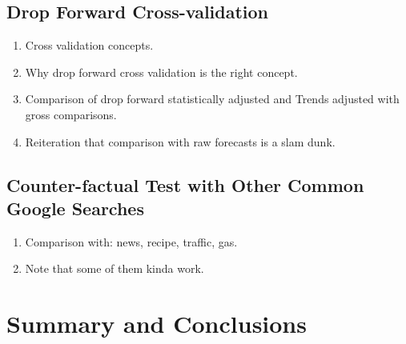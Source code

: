 \documentclass{article}
\begin{document}
  



  \subsection{Drop Forward Cross-validation}


  
  
    \begin{enumerate}
      \item Cross validation concepts.
      \item Why drop forward cross validation is the right concept.
      \item Comparison of drop forward statistically adjusted and Trends adjusted with gross comparisons.
      \item Reiteration that comparison with raw forecasts is a slam dunk.
    \end{enumerate}
    
  \subsection{Counter-factual Test with Other Common Google Searches}
  
  
  
    \begin{enumerate}
      \item Comparison with: news, recipe, traffic, gas.
      \item Note that some of them kinda work.
    \end{enumerate}
    

\section{Summary and Conclusions}

% 
% 
\end{document}
